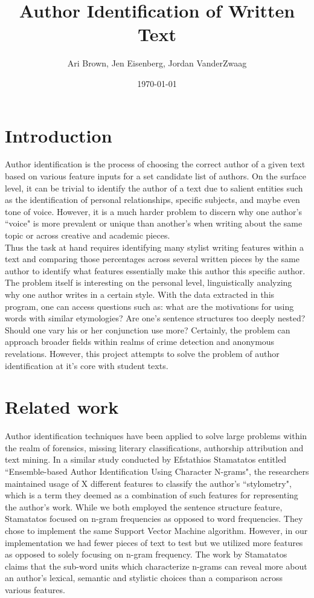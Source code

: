 \documentclass[twocolumn]{article}
\title{Author Identification of Written Text}
\author{Ari Brown, Jen Eisenberg, Jordan VanderZwaag}
\date{\today}
\begin{document}
  \maketitle

  \section{Introduction}
  Author identification is the process of choosing the correct author of a given text based on various feature inputs for a set candidate list of authors. On the surface level, it can be trivial to identify the author of a text due to salient entities such as the identification of personal relationships, specific subjects, and maybe even tone of voice. However, it is a much harder problem to discern why one author's ``voice" is more prevalent or unique than another's when writing about the same topic or across creative and academic pieces. \\
  
  Thus the task at hand requires identifying many stylist writing features within a text and comparing those percentages across several written pieces by the same author to identify what features essentially make this author this specific author. The problem itself is interesting on the personal level, linguistically analyzing why one author writes in a certain style. With the data extracted in this program, one can access questions such as: what are the motivations for using words with similar etymologies? Are one's sentence structures too deeply nested? Should one vary his or her conjunction use more? Certainly, the problem can approach broader fields within realms of crime detection and anonymous revelations. However, this project attempts to solve the problem of author identification at it's core with student texts.
  
  \section{Related work}
  Author identification techniques have been applied to solve large problems within the realm of forensics, missing literary classifications, authorship attribution and text mining. In a similar study conducted by Efstathios Stamatatos entitled ``Ensemble-based Author Identification Using Character N-grams", the researchers maintained usage of X different features to classify the author's ``stylometry", which is a term they deemed as a combination of such features for representing the author's work. While we both employed the sentence structure feature, Stamatatos focused on n-gram frequencies as opposed to word frequencies. They chose to implement the same Support Vector Machine algorithm. However, in our implementation we had fewer pieces of text to test but we utilized more features as opposed to solely focusing on n-gram frequency. The work by Stamatatos claims that the sub-word units which characterize n-grams can reveal more about an author's lexical, semantic and stylistic choices than a comparison across various features.
  
\end{document}

